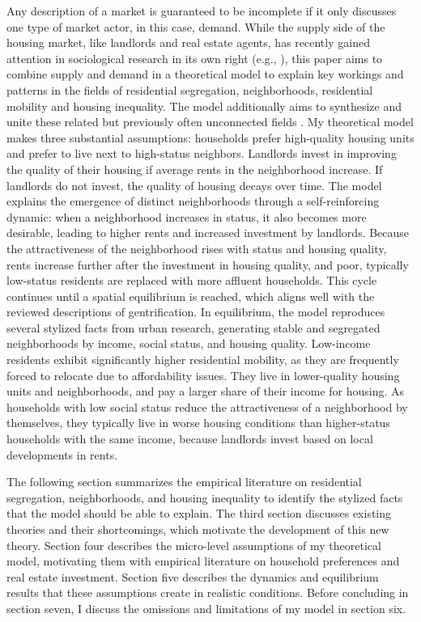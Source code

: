 \documentclass[a4paper,12pt]{article}
\begin{document}
Any description of a market is guaranteed to be incomplete if it only discusses one type of market actor, in this case, demand. While the supply side of the housing market, like landlords and real estate agents, has recently gained attention in sociological research in its own right (e.g., \cite{korver-glennCompoundingInequalitiesHow2018, desmondPoorPayMore2019, rosenRacialDiscriminationHousing2021}), this paper aims to combine supply and demand in a theoretical model to explain key workings and patterns in the fields of residential segregation, neighborhoods, residential mobility and housing inequality. The model additionally aims to synthesize and unite these related but previously often unconnected fields \citep{hwangThingsChangeThings2016}. My theoretical model makes three substantial assumptions: households prefer high-quality housing units and prefer to live next to high-status neighbors. Landlords invest in improving the quality of their housing if average rents in the neighborhood increase. If landlords do not invest, the quality of housing decays over time. The model explains the emergence of distinct neighborhoods through a self-reinforcing dynamic: when a neighborhood increases in status, it also becomes more desirable, leading to higher rents and increased investment by landlords. Because the attractiveness of the neighborhood rises with status and housing quality, rents increase further after the investment in housing quality, and poor, typically low-status residents are replaced with more affluent households. This cycle continues until a spatial equilibrium is reached, which aligns well with the reviewed descriptions of gentrification. In equilibrium, the model reproduces several stylized facts from urban research, generating stable and segregated neighborhoods by income, social status, and housing quality. Low-income residents exhibit significantly higher residential mobility, as they are frequently forced to relocate due to affordability issues. They live in lower-quality housing units and neighborhoods, and pay a larger share of their income for housing. As households with low social status reduce the attractiveness of a neighborhood by themselves, they typically live in worse housing conditions than higher-status households with the same income, because landlords invest based on local developments in rents.

The following section summarizes the empirical literature on residential segregation, neighborhoods, and housing inequality to identify the stylized facts that the model should be able to explain. The third section discusses existing theories and their shortcomings, which motivate the development of this new theory. Section four describes the micro-level assumptions of my theoretical model, motivating them with empirical literature on household preferences and real estate investment. Section five describes the dynamics and equilibrium results that these assumptions create in realistic conditions. Before concluding in section seven, I discuss the omissions and limitations of my model in section six.
\end{document}
